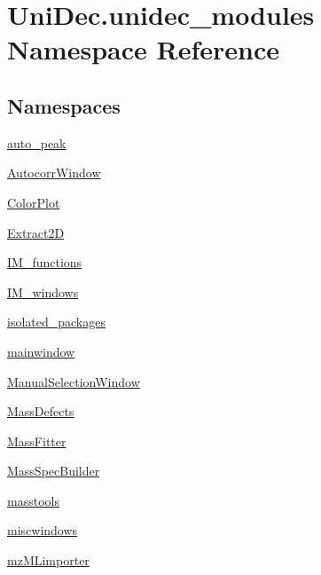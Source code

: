 \hypertarget{namespace_uni_dec_1_1unidec__modules}{}\section{Uni\+Dec.\+unidec\+\_\+modules Namespace Reference}
\label{namespace_uni_dec_1_1unidec__modules}
\subsection*{Namespaces}
\begin{DoxyCompactItemize}
\item 
 \hyperlink{namespace_uni_dec_1_1unidec__modules_1_1auto__peak}{auto\+\_\+peak}
\item 
 \hyperlink{namespace_uni_dec_1_1unidec__modules_1_1_autocorr_window}{Autocorr\+Window}
\item 
 \hyperlink{namespace_uni_dec_1_1unidec__modules_1_1_color_plot}{Color\+Plot}
\item 
 \hyperlink{namespace_uni_dec_1_1unidec__modules_1_1_extract2_d}{Extract2\+D}
\item 
 \hyperlink{namespace_uni_dec_1_1unidec__modules_1_1_i_m__functions}{I\+M\+\_\+functions}
\item 
 \hyperlink{namespace_uni_dec_1_1unidec__modules_1_1_i_m__windows}{I\+M\+\_\+windows}
\item 
 \hyperlink{namespace_uni_dec_1_1unidec__modules_1_1isolated__packages}{isolated\+\_\+packages}
\item 
 \hyperlink{namespace_uni_dec_1_1unidec__modules_1_1mainwindow}{mainwindow}
\item 
 \hyperlink{namespace_uni_dec_1_1unidec__modules_1_1_manual_selection_window}{Manual\+Selection\+Window}
\item 
 \hyperlink{namespace_uni_dec_1_1unidec__modules_1_1_mass_defects}{Mass\+Defects}
\item 
 \hyperlink{namespace_uni_dec_1_1unidec__modules_1_1_mass_fitter}{Mass\+Fitter}
\item 
 \hyperlink{namespace_uni_dec_1_1unidec__modules_1_1_mass_spec_builder}{Mass\+Spec\+Builder}
\item 
 \hyperlink{namespace_uni_dec_1_1unidec__modules_1_1masstools}{masstools}
\item 
 \hyperlink{namespace_uni_dec_1_1unidec__modules_1_1miscwindows}{miscwindows}
\item 
 \hyperlink{namespace_uni_dec_1_1unidec__modules_1_1mz_m_limporter}{mz\+M\+Limporter}

\end{DoxyCompactItemize}
